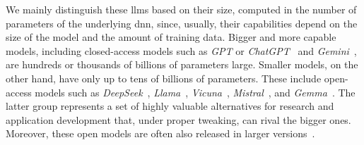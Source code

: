 \documentclass[manuscript,screen]{acmart}
\begin{document}
We mainly distinguish these \acp{llm} based on their size, computed in the number of parameters of the underlying \ac{dnn}, since, usually, their capabilities depend on the size of the model and the amount of training data.
Bigger and more capable models, including closed-access models such as \emph{GPT} or \emph{ChatGPT}~\cite{DBLP:journals/corr/abs-2303-08774,DBLP:journals/corr/abs-2410-21276} and \emph{Gemini}~\cite{DBLP:journals/corr/abs-2312-11805,DBLP:journals/corr/abs-2403-05530}, are hundreds or thousands of billions of parameters large.
Smaller models, on the other hand, have only up to tens of billions of parameters.
These include open-access models such as \emph{DeepSeek}~\cite{DBLP:journals/corr/abs-2401-02954,DBLP:journals/corr/abs-2405-04434,DBLP:journals/corr/abs-2412-19437}, \emph{Llama}~\cite{DBLP:journals/corr/abs-2307-09288,DBLP:journals/corr/abs-2407-21783}, \emph{Vicuna}~\cite{lmsys2023vicuna}, \emph{Mistral}~\cite{DBLP:journals/corr/abs-2310-06825,DBLP:journals/corr/abs-2401-04088}, and \emph{Gemma}~\cite{DBLP:journals/corr/abs-2403-08295,DBLP:journals/corr/abs-2408-00118}.
The latter group represents a set of highly valuable alternatives for research and application development that, under proper tweaking, can rival the bigger ones.
Moreover, these open models are often also released in larger versions~\cite{DBLP:journals/corr/abs-2412-19437,DBLP:journals/corr/abs-2407-21783,DBLP:journals/corr/abs-2401-04088}.
\end{document}
